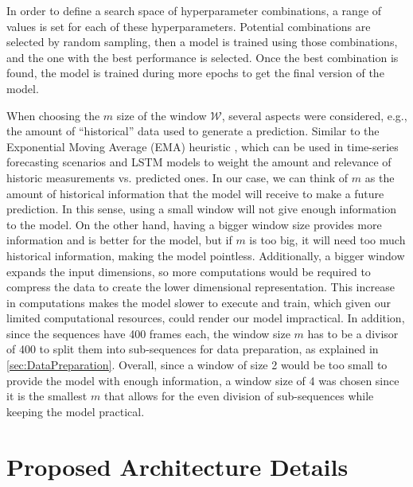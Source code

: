 In order to define a search space of hyperparameter combinations, a range of values is set for each of these hyperparameters.  Potential combinations are selected by random sampling, then a model is trained using those combinations, and the one with the best performance is selected. Once the best combination is found, the model is trained during more epochs to get the final version of the model.

When choosing the $m$ size of the window $\mathcal{W}$, several aspects were considered, e.g., the amount of ``historical'' data used to generate a prediction. Similar to the Exponential Moving Average (EMA) heuristic \cite{kalekar_time_2004} \cite{ugli_cognitive_2023}, which can be used in time-series forecasting scenarios and LSTM models to weight the amount and relevance of historic measurements vs. predicted ones. In our case, we can think of $m$ as the amount of historical information that the model will receive to make a future prediction. In this sense, using a small window will not give enough information to the model. On the other hand, having a bigger window size provides more information and is better for the model, but if $m$ is too big, it will need too much historical information, making the model pointless. Additionally, a bigger window expands the input dimensions, so more computations would be required to compress the data to create the lower dimensional representation. This increase in computations makes the model slower to execute and train, which given our limited computational resources, could render our model impractical. In addition, since the sequences have 400 frames each, the window size $m$ has to be a divisor of 400 to split them into sub-sequences for data preparation, as explained in \ref{sec:DataPreparation}. Overall, since a window of size 2 would be too small to provide the model with enough information, a window size of 4 was chosen since it is the smallest $m$ that allows for the even division of sub-sequences while keeping the model practical.


\section{Proposed Architecture Details}
\label{sec:ArchitectureDetails}

